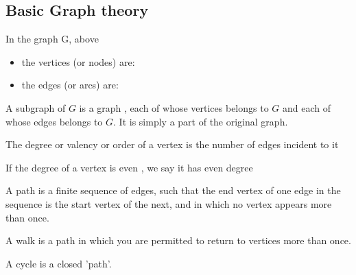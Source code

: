 \documentclass[a4paper]{article}
\begin{document}
\subsection{Basic Graph theory}
\begin{defi}
In the graph G, above
\begin{itemize}
\item the vertices (or nodes) are:
\item the edges (or arcs) are:
\end{itemize}
\end{defi}

\begin{defi}[Subgraph]
A subgraph of $G$ is a graph , each of whose vertices belongs to $G$ and each of whose edges belongs to $G$. It is simply a part of the original graph.
\end{defi}

\begin{defi}[Degree]
The degree or valency or order of a vertex is the number of edges incident to it
\end{defi}

\begin{prop}
If the degree of a vertex is even , we say it has even degree 
\end{prop}

\begin{defi}[Path]
A path is a finite sequence of edges, such that the end vertex of one edge in the sequence is the start vertex of the next, and in which no vertex appears more than once.
\end{defi}

\begin{defi}[Walk]
A walk is a path in which you are permitted to return to vertices more than once. 
\end{defi}

\begin{defi}[Cycle]
A cycle is a closed 'path'.
\end{defi}
\end{document}
